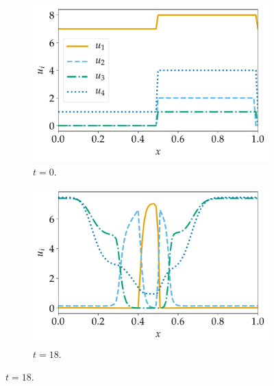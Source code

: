 \documentclass[a4paper]{article}
\numberwithin{equation}{section}
\theoremstyle{plain}
\theoremstyle{definition}
\numberwithin{theorem}{section}
\newcommand{\1}{\mathbbm{1}}
\begin{document}
\begin{figure}
    \centering
    \begin{subfigure}[b]{0.49\textwidth}
        \includegraphics[width=\textwidth]{plots/ADP_sol_00.pdf}
        \caption{$t=0$.}
        \label{fig:sol_ADP00}
    \end{subfigure}
    \begin{subfigure}[b]{0.49\textwidth}
        \includegraphics[width=\textwidth]{plots/ADP_sol_18.pdf}
        \caption{$t=18$.}
        \label{fig:sol_ADP18}
    \end{subfigure}


\end{figure}
\end{document}
